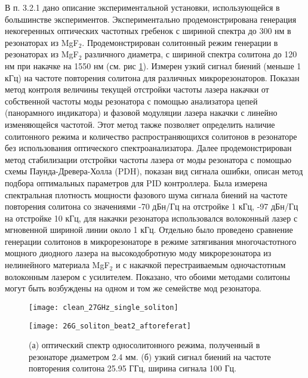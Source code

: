 В п. 3.2.1 дано описание экспериментальной установки, использующейся в большинстве экспериментов. Экспериментально продемонстрирована генерация некогеренных оптических частотных гребенок с шириной спектра до 300 нм в резонаторах из MgF$_2$. Продемонстрирован солитонный режим генерации в резонаторах из MgF$_2$ различного диаметра, с шириной спектра солитона до 120 нм при накачке на 1550 нм (см. рис \ref{clean_27GHz_single_soliton}). Измерен узкий сигнал биений (меньше 1 кГц) на частоте повторения солитона для различных микрорезонаторов. Показан метод контроля величины текущей отстройки частоты лазера накачки от собственной частоты моды резонатора с помощью анализатора цепей (панорамного индикатора) и фазовой модуляции лазера накачки с линейно изменяющейся частотой. Этот метод также позволяет определить наличие солитонного режима и количество распространяющихся солитонов в резонаторе без использования оптического спектроанализатора. Далее продемонстрирован метод стабилизации отстройки частоты лазера от моды резонатора с помощью схемы Паунда-Древера-Холла (PDH), показан вид сигнала ошибки, описан метод подбора оптимальных параметров для PID контроллера. Была измерена спектральная плотность мощности фазового шума сигнала биений на частоте повторения солитона со значениями -70 дБн/Гц на отстройке 1 кГц, -97 дБн/Гц на отстройке 10 кГц, для накачки резонатора использовался волоконный лазер с мгновенной шириной линии около 1 кГц. Отдельно было проведено сравнение генерации солитонов в микрорезонаторе в режиме затягивания многочастотного мощного диодного лазера на высокодобротную моду микрорезонатора из нелинейного материала MgF$_2$ и с накачкой перестраиваемым одночастотным волоконным лазером с усилителем. Показано, что обоими методами солитоны могут быть возбуждены на одном и том же семействе мод резонатора.

\begin{figure}[!htb]
  \begin{minipage}{0.49\linewidth}\centering
    \texttt{[image: clean\_27GHz\_single\_soliton]}
  \end{minipage}
  \hfill
  \begin{minipage}{0.49\linewidth}\centering
    \texttt{[image: 26G\_soliton\_beat2\_aftoreferat]}
  \end{minipage}
  \caption{(а) оптический спектр односолитонного режима, полученный в резонаторе диаметром 2.4 мм. (б) узкий сигнал биений на частоте повторения солитона 25.95 ГГц, ширина сигнала 100 Гц.}
  \label{clean_27GHz_single_soliton}
\end{figure}

